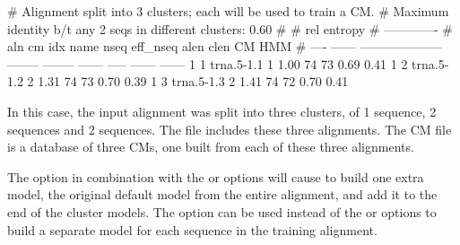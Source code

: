 {\samepage
{}

\begin{sreoutput}
# Alignment split into 3 clusters; each will be used to train a CM.
# Maximum identity b/t any 2 seqs in different clusters: 0.60
#
#                                                                  rel entropy 
#                                                                 -------------
# aln  cm idx name                     nseq eff_nseq   alen  clen     CM    HMM
# ---- ------ -------------------- -------- -------- ------ ----- ------ ------
     1      1 trna.5-1.1                  1     1.00     74    73   0.69   0.41
     1      2 trna.5-1.2                  2     1.31     74    73   0.70   0.39
     1      3 trna.5-1.3                  2     1.41     74    72   0.70   0.41
\end{sreoutput}
}

In this case, the input alignment was split into three
clusters, of 1 sequence, 2 sequences and 2 sequences. The file
 includes these three alignments. The CM file
 is a database of three CMs, one built from
each of these three alignments. 

The  option in combination with the  or
 options will cause  to build one extra
model, the original default model from the entire alignment, and add
it to the end of the cluster models. The  option can be
used instead of the  or  options to
build a separate model for each sequence in the training alignment.

